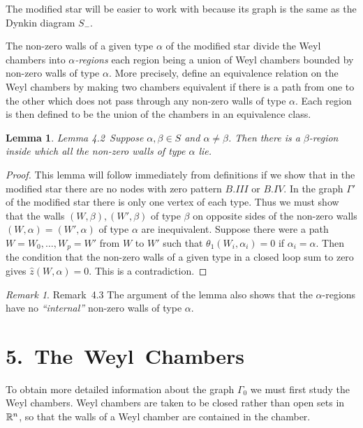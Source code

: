 \documentclass{memo-l}
\newtheorem{lemma}[theorem]{Lemma}
\theoremstyle{definition}
\theoremstyle{remark}
\newtheorem{remark}[theorem]{Remark}
\numberwithin{section}{chapter}
\numberwithin{equation}{chapter}
\begin{document}
The modified star will be easier to work with because its graph is the same
as the Dynkin diagram $S_{-}$.
 

   The non-zero walls of a given type ${\alpha}$ of the modified star
divide the Weyl chambers into {\it $\alpha$-regions} each region being a
union of Weyl chambers bounded by non-zero walls of type ${\alpha}$.  More
precisely, define an equivalence relation on the Weyl chambers by making
two chambers equivalent if there is a path from one to the other which does
not pass through any non-zero walls of type ${\alpha}$.  Each region is
then defined to be the union of the chambers in an equivalence class.

\medskip

\begin{lemma}{Lemma 4.2}\ Suppose ${\alpha},{\beta}  \in  S$ and
${\alpha}\ne {\beta}$.  Then there is a ${\beta}$-region inside which all
the non-zero walls of type ${\alpha}$ lie.
\end{lemma}

\begin{proof}   This lemma will follow immediately from
definitions if we show that in the modified star there are no nodes with
zero pattern $B.III$ or $B.IV$.  In the graph ${\Gamma}'$ of the modified
star there is only one vertex of each type.  Thus we must show that the
walls $(W,{\beta}), (W',{\beta})$ of type ${\beta}$ on opposite sides of
the non-zero walls $(W,{\alpha}) = (W',{\alpha})$ of type ${\alpha}$ are
inequivalent.  Suppose there were a path $W = W_{0},\ldots ,W_{p} = W'$ from
$W$ to $W'$ such that ${\theta}_{1}(W_{i},{\alpha}_{i}) = 0$ if
${\alpha}_{i} = {\alpha}$.  Then the condition that the non-zero walls of a
given type in a closed loop sum to zero gives $\hat z(W,{\alpha}) = 0$.
This is a contradiction.
\end{proof} 


\begin{remark}{Remark\ 4.3} The argument of the lemma also shows that the
${\alpha}$-regions have no {\it ``internal''} non-zero walls of type ${\alpha}$.
\end{remark}




\section{5.\ The\ Weyl\ Chambers}

   To obtain more detailed information about the graph ${\Gamma}_{0}$ we
must first study the Weyl chambers.  Weyl chambers are taken to be closed
rather than open sets in ${\Bbb R}^{n}$, so that the walls of a Weyl
chamber are contained in the chamber.
\end{document}
